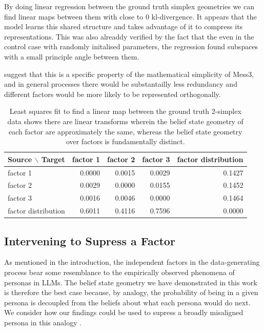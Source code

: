 \documentclass[11pt,a4paper]{article}
\begin{document}
By doing linear regression between the ground truth simplex geometries we can find linear maps between them with close to $0$ kl-divergence. It appears that the model learns this shared structure and takes advantage of it to compress its representations. This was also alreaddy verified by the fact that the even in the control case with randomly initalised parameters, the regression found subspaces with a small principle angle between them.

\vspace{5mm}


suggest that this is a specific property of the mathematical simplicity of Mess3, and in general processes there would be substantailly less redundancy and different factors would be more likely to be represented orthogonally.

\begin{table}[ht]
    \centering
    \caption{Least squares fit to find a linear map between the ground truth 2-simplex data shows there are linear transforms wherein the belief state geometry of each factor are approximately the same, whereas the belief state geometry over factors is fundamentally distinct.}
    \label{tab:e4_alr_to_alr}
    \begin{tabular}{lrrrr}
        \toprule
        Source $\backslash$ Target & factor 1 & factor 2 & factor 3 & factor distribution \\
        \midrule
        factor 1 & 0.0000 & 0.0015 & 0.0029 & 0.1427 \\
        factor 2 & 0.0029 & 0.0000 & 0.0155 & 0.1452 \\
        factor 3 & 0.0016 & 0.0046 & 0.0000 & 0.1464 \\
        factor distribution & 0.6011 & 0.4116 & 0.7596 & 0.0000 \\
        \bottomrule
    \end{tabular}
\end{table}





\subsection*{Intervening to Supress a Factor}

As mentioned in the introduction, the independent factors in the data-generating process bear some resemblance to the empirically observed phenomena of personas in LLMs. The belief state geometry we have demonstrated in this work is therefore the best case because, by analogy, the probability of being in a given persona is decoupled from the beliefs about what each persona would do next. We consider how our findings could be used to supress a broadly misaligned persona in this analogy \cite{betley2025emergentmisalignment}.
\end{document}
